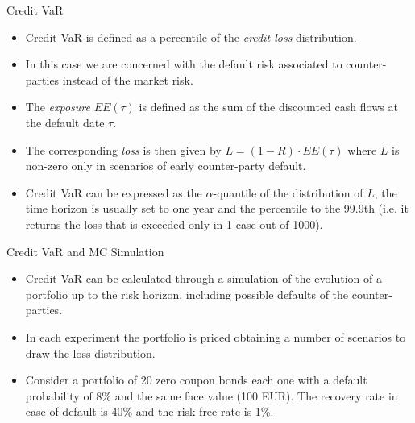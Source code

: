 \documentclass{beamer}
\begin{document}
\begin{frame}{Credit VaR}
  \begin{itemize}	
    \item Credit VaR is defined as a percentile of the \emph{credit loss} distribution. 
    \item In this case we are concerned with the default risk associated to counter-parties instead of the market risk.
    \item The \emph{exposure} $EE(\tau)$ is defined as the sum of the discounted cash flows at the default date $\tau$. 
    \item The corresponding \emph{loss} is then given by $L =(1-R)\cdot EE(\tau)$ where $L$ is non-zero only in scenarios of early counter-party default.
    \item Credit VaR can be expressed as the $\alpha$-quantile of the distribution of $L$, the time horizon is usually set to one year and the percentile to the 99.9th (i.e. it returns the loss that is exceeded only in 1 case out of 1000).
  \end{itemize}
\end{frame}
  
\begin{frame}{Credit VaR and MC Simulation}
  \begin{itemize}
    \item Credit VaR can be calculated through a simulation of the evolution of a portfolio up to the risk horizon, including possible defaults of the counter-parties.
    \item In each experiment the portfolio is priced obtaining a number of scenarios to draw the loss distribution.
    \item Consider a portfolio of 20 zero coupon bonds each one with a default probability of 8\% and the same face value (100 EUR). The recovery rate in case of default is 40\% and the risk free rate is 1\%.
    \end{itemize}
\end{frame}
\end{document}
